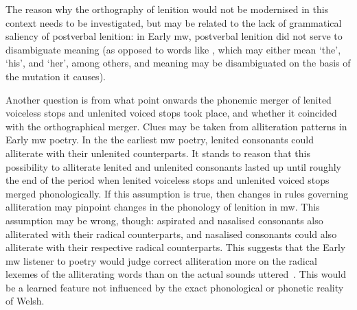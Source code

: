  The reason why the orthography of lenition would not be modernised in this context needs to be investigated, but may be related to the lack of grammatical saliency of postverbal lenition: in Early \gls{mw}, postverbal lenition did not serve to disambiguate meaning (as opposed to words like , which may either mean `the', `his', and `her', among others, and meaning may be disambiguated on the basis of the mutation it causes). 
 
 Another question is from what point onwards the phonemic merger of lenited voiceless stops and unlenited voiced stops took place, and whether it coincided with the orthographical merger. Clues may be taken from alliteration patterns in Early \gls{mw} poetry. In the the earliest \gls{mw} poetry, lenited consonants could alliterate with their unlenited counterparts. It stands to reason that this possibility to alliterate lenited and unlenited consonants lasted up until roughly the end of the period when lenited voiceless stops and unlenited voiced stops merged phonologically. If this assumption is true, then changes in rules governing alliteration may pinpoint changes in the phonology of lenition in \gls{mw}. This assumption may be wrong, though: aspirated and nasalised consonants also alliterated with their radical counterparts, and nasalised consonants could also alliterate with their respective radical counterparts. This suggests that the Early \gls{mw} listener to poetry would judge correct alliteration more on the radical lexemes of the alliterating words than on the actual sounds uttered~\parencite[339]{rowland_early_1990}. This would be a learned feature not influenced by the exact phonological or phonetic reality of Welsh.
 
 

